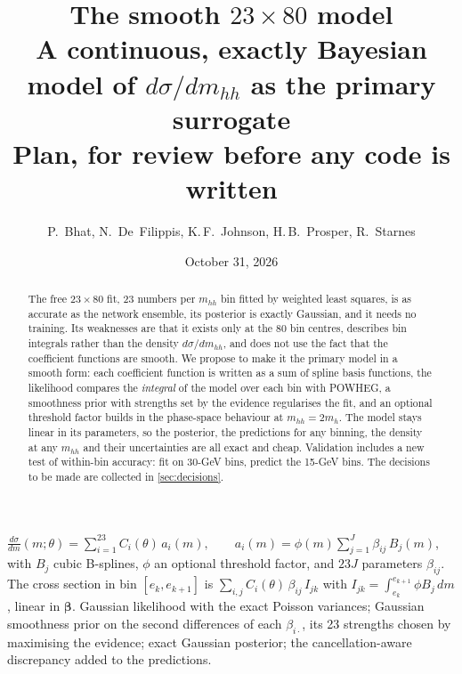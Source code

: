 
\newcommand{\bbeta}{\boldsymbol{\beta}}
\newcommand{\bC}{\boldsymbol{C}}

\title{\textbf{The smooth $23\times80$ model}\\[4pt]
\large A continuous, exactly Bayesian model of $d\sigma/dm_{hh}$ as the primary surrogate\\[4pt]
\normalsize Plan, for review before any code is written}
\author{P.~Bhat, N.~De~Filippis, K.\,F.~Johnson, H.\,B.~Prosper, R.~Starnes}
\date{October 31, 2026}


\maketitle

\begin{abstract}
\noindent
The free $23\times80$ fit, 23 numbers per $m_{hh}$ bin fitted by weighted least squares, is
as accurate as the network ensemble, its posterior is exactly Gaussian, and it needs no
training. Its weaknesses are that it exists only at the 80 bin centres, describes bin
integrals rather than the density $d\sigma/dm_{hh}$, and does not use the fact that the
coefficient functions are smooth. We propose to make it the primary model in a smooth form:
each coefficient function is written as a sum of spline basis functions, the likelihood
compares the \emph{integral} of the model over each bin with POWHEG, a smoothness prior with
strengths set by the evidence regularises the fit, and an optional threshold factor builds in
the phase-space behaviour at $m_{hh} = 2m_h$. The model stays linear in its parameters, so
the posterior, the predictions for any binning, the density at any $m_{hh}$ and their
uncertainties are all exact and cheap. Validation includes a new test of within-bin
accuracy: fit on 30-GeV bins, predict the 15-GeV bins. The decisions to be made are collected
in \cref{sec:decisions}.
\end{abstract}

\begin{keyidea}
$\displaystyle \frac{d\sigma}{dm}(m;\theta) = \sum_{i=1}^{23} C_i(\theta)\, a_i(m), \qquad
a_i(m) = \phi(m)\sum_{j=1}^{J}\beta_{ij}\, B_j(m)$, with $B_j$ cubic B-splines, $\phi$ an
optional threshold factor, and $23J$ parameters $\beta_{ij}$. The cross section in bin
$[e_k, e_{k+1}]$ is $\sum_{i,j} C_i(\theta)\,\beta_{ij}\,I_{jk}$ with
$I_{jk} = \int_{e_k}^{e_{k+1}}\phi B_j\,dm$, linear in $\bbeta$. Gaussian likelihood with the
exact Poisson variances; Gaussian smoothness prior on the second differences of each
$\beta_{i\cdot}$, its 23 strengths chosen by maximising the evidence; exact Gaussian
posterior; the cancellation-aware discrepancy added to the predictions.
\end{keyidea}

